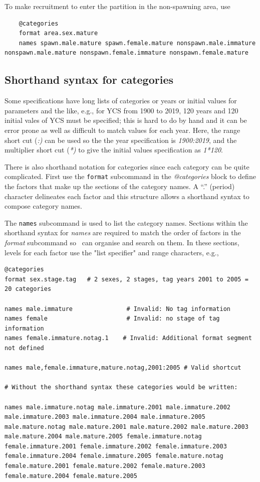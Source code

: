 To make recruitment to enter the partition in the non-spawning area, use

{\small{\begin{lstlisting}
	@categories
	format area.sex.mature
	names spawn.male.mature spawn.female.mature nonspawn.male.immature nonspawn.male.mature nonspawn.female.immature nonspawn.female.mature
\end{lstlisting}}}

\subsection{Shorthand syntax for categories}\label{sec:ShorthandSyntax}

Some specifications have long lists of categories or years or initial values for parameters and the like, e.g., for YCS from 1900 to 2019, 120 years and 120 initial vales of YCS must be specified; this is hard to do by hand and it can be error prone as well as difficult to match values for each year. Here, the range short cut (\textit{:)} can be used so the  the year specification is \textit{1900:2019}, and the multiplier short cut (\textit{*)} to give the initial values specification as \textit{1*120}.

There is also shorthand notation for categories since each category can be quite complicated\label{sec:Categories}. First use the \texttt{format} subcommand in the \textit{@categories} block to define the factors that make up the sections of the category names. A ``.'' (period) character delineates each factor and this structure allows a shorthand syntax to compose category names.

The \texttt{names} subcommand is used to list the category names. Sections within the shorthand syntax for \textit{names} are required to match the order of factors in the \textit{format} subcommand so \CNAME\ can organise and search on them. In these sections, levels for each factor use the "list specifier" and range characters, e.g.,

{\small{\begin{lstlisting}
@categories
format sex.stage.tag   # 2 sexes, 2 stages, tag years 2001 to 2005 = 20 categories

names male.immature               # Invalid: No tag information
names female                      # Invalid: no stage of tag information
names female.immature.notag.1    # Invalid: Additional format segment not defined

names male,female.immature,mature.notag,2001:2005 # Valid shortcut

# Without the shorthand syntax these categories would be written:

names male.immature.notag male.immature.2001 male.immature.2002 male.immature.2003 male.immature.2004 male.immature.2005 male.mature.notag male.mature.2001 male.mature.2002 male.mature.2003 male.mature.2004 male.mature.2005 female.immature.notag female.immature.2001 female.immature.2002 female.immature.2003 female.immature.2004 female.immature.2005 female.mature.notag female.mature.2001 female.mature.2002 female.mature.2003 female.mature.2004 female.mature.2005
\end{lstlisting}}}

